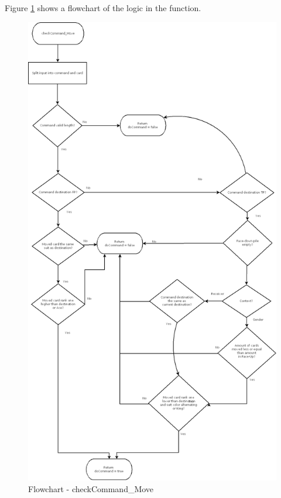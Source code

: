 \documentclass[runningheads,a4paper]{llncs}
\begin{document}
Figure \ref{fig:checkCommand_Move} shows a flowchart of the logic in the function.
\begin{figure}
	\begin{center}
		\includegraphics[width=\textwidth]{images/checkCommand_Move}
		\caption{Flowchart - checkCommand\_Move}
		\label{fig:checkCommand_Move}
	\end{center}
\end{figure}
\clearpage
\end{document}
